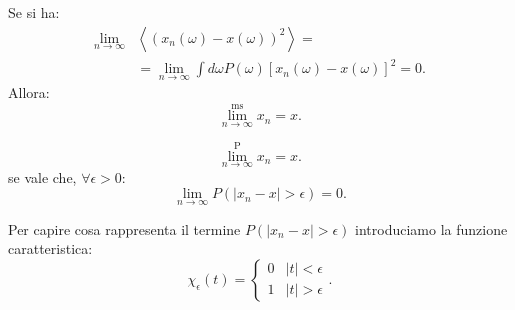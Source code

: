\begin{defn}[\textcolor{red}{Mean Square Limit}]
    \label{def:mslim}
    Se si ha:
    \[\begin{aligned}
	\lim_{n \to \infty} & 
	\left<\left(x_n(\omega) -x(\omega) \right)^2\right> =\\
			    &=\lim_{n \to \infty} 
			    \int  d\omega  P(\omega) 
			    \left[ x_n(\omega) -x(\omega) \right]^2 = 0
    .\end{aligned}\]
    Allora:
    \[
        \lim^{\text{ms}}_{n \to \infty} x_n = x
    .\] 
\end{defn}
\begin{defn}[\textcolor{red}{Limite in probabilità}] 
    \[
        \lim^{\text{P}}_{n \to \infty} x_n = x
    .\] 
    se vale che, $ \forall \epsilon  > 0$:
    \[
	\lim_{n \to \infty} P(\left|x_n-x\right| > \epsilon) = 0
    .\] 
\end{defn}
\noindent
Per capire cosa rappresenta il termine $P(\left|x_n - x\right|>\epsilon)$ introduciamo la funzione caratteristica:
\[
    \chi_\epsilon (t) = 
    \begin{cases}
	0 & \left|t\right|< \epsilon\\
	1 & \left|t\right|>\epsilon
    \end{cases}
.\] 

